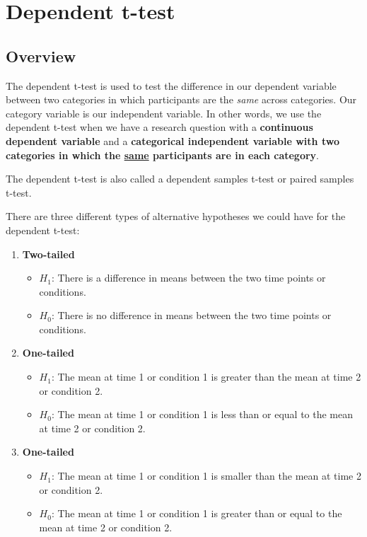 \documentclass[
]{book}
\providecommand{\tightlist}{%
  \setlength{\itemsep}{0pt}\setlength{\parskip}{0pt}}
\begin{document}
\hypertarget{dependent-t-test}{%
\section{Dependent t-test}\label{dependent-t-test}}

\hypertarget{overview-2}{%
\subsection{Overview}\label{overview-2}}

The dependent t-test is used to test the difference in our dependent variable between two categories in which participants are the \emph{same} across categories. Our category variable is our independent variable. In other words, we use the dependent t-test when we have a research question with a \textbf{continuous dependent variable} and a \textbf{categorical independent variable with two categories in which the \underline{same} participants are in each category}.

The dependent t-test is also called a dependent samples t-test or paired samples t-test.

There are three different types of alternative hypotheses we could have for the dependent t-test:

\begin{enumerate}
\def\labelenumi{\arabic{enumi}.}
\item
  \textbf{Two-tailed}

  \begin{itemize}
  \tightlist
  \item
    \(H_1\): There is a difference in means between the two time points or conditions.
  \item
    \(H_0\): There is no difference in means between the two time points or conditions.
  \end{itemize}
\item
  \textbf{One-tailed}

  \begin{itemize}
  \tightlist
  \item
    \(H_1\): The mean at time 1 or condition 1 is greater than the mean at time 2 or condition 2.
  \item
    \(H_0\): The mean at time 1 or condition 1 is less than or equal to the mean at time 2 or condition 2.
  \end{itemize}
\item
  \textbf{One-tailed}

  \begin{itemize}
  \tightlist
  \item
    \(H_1\): The mean at time 1 or condition 1 is smaller than the mean at time 2 or condition 2.
  \item
    \(H_0\): The mean at time 1 or condition 1 is greater than or equal to the mean at time 2 or condition 2.
  \end{itemize}
\end{enumerate}
\end{document}
